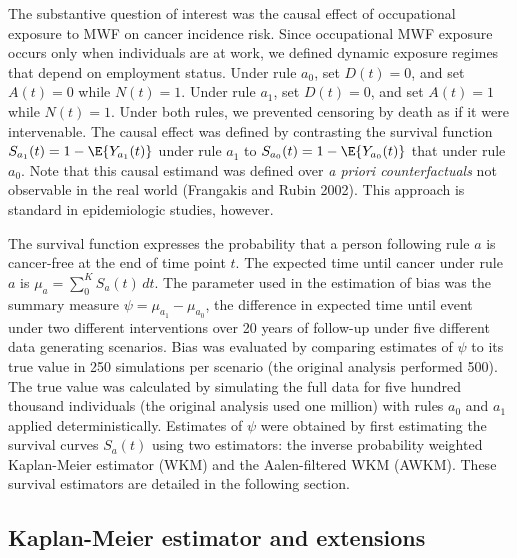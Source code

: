 \documentclass[
  11pt,
]{article}
\begin{document}
The substantive question of interest was the causal effect of
occupational exposure to MWF on cancer incidence risk. Since
occupational MWF exposure occurs only when individuals are at work, we
defined dynamic exposure regimes that depend on employment status. Under
rule \(a_0\), set \(D(t) = 0\), and set \(A(t) = 0\) while \(N(t) = 1\).
Under rule \(a_1\), set \(D(t) = 0\), and set \(A(t) = 1\) while
\(N(t) = 1\). Under both rules, we prevented censoring by death as if it
were intervenable. The causal effect was defined by contrasting the
survival function \(S_{a_1}(t) = 1 - \E{Y_{a_1}(t)}\) under rule \(a_1\)
to \(S_{a_0}(t) = 1 - \E{Y_{a_0}(t)}\) that under rule \(a_0\). Note
that this causal estimand was defined over \emph{a priori
counterfactuals} not observable in the real world (Frangakis and Rubin
2002). This approach is standard in epidemiologic studies, however.

The survival function expresses the probability that a person following
rule \(a\) is cancer-free at the end of time point \(t\). The expected
time until cancer under rule \(a\) is
\(\mu_{a} = \sum_0^K S_{a}(t) \, dt\). The parameter used in the
estimation of bias was the summary measure
\(\psi = \mu_{a_1} - \mu_{a_0}\), the difference in expected time until
event under two different interventions over 20 years of follow-up under
five different data generating scenarios. Bias was evaluated by
comparing estimates of \(\psi\) to its true value in 250 simulations per
scenario (the original analysis performed 500). The true value was
calculated by simulating the full data for five hundred thousand
individuals (the original analysis used one million) with rules \(a_0\)
and \(a_1\) applied deterministically. Estimates of \(\psi\) were
obtained by first estimating the survival curves \(S_a(t)\) using two
estimators: the inverse probability weighted Kaplan-Meier estimator
(WKM) and the Aalen-filtered WKM (AWKM). These survival estimators are
detailed in the following section.

\hypertarget{kaplan-meier-estimator-and-extensions}{%
\subsection{Kaplan-Meier estimator and
extensions}\label{kaplan-meier-estimator-and-extensions}}
\end{document}
